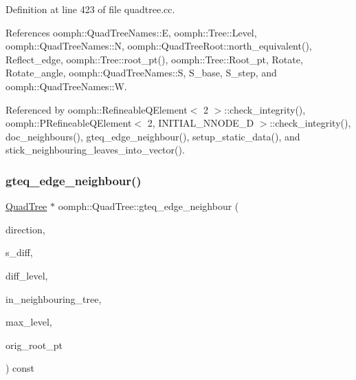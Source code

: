 Definition at line 423 of file quadtree.\+cc.



References oomph\+::\+Quad\+Tree\+Names\+::E, oomph\+::\+Tree\+::\+Level, oomph\+::\+Quad\+Tree\+Names\+::N, oomph\+::\+Quad\+Tree\+Root\+::north\+\_\+equivalent(), Reflect\+\_\+edge, oomph\+::\+Tree\+::root\+\_\+pt(), oomph\+::\+Tree\+::\+Root\+\_\+pt, Rotate, Rotate\+\_\+angle, oomph\+::\+Quad\+Tree\+Names\+::S, S\+\_\+base, S\+\_\+step, and oomph\+::\+Quad\+Tree\+Names\+::W.



Referenced by oomph\+::\+Refineable\+Q\+Element$<$ 2 $>$\+::check\+\_\+integrity(), oomph\+::\+P\+Refineable\+Q\+Element$<$ 2, I\+N\+I\+T\+I\+A\+L\+\_\+\+N\+N\+O\+D\+E\+\_\+D $>$\+::check\+\_\+integrity(), doc\+\_\+neighbours(), gteq\+\_\+edge\+\_\+neighbour(), setup\+\_\+static\+\_\+data(), and stick\+\_\+neighbouring\+\_\+leaves\+\_\+into\+\_\+vector().

\mbox{\label{classoomph_1_1QuadTree_af2a28294f1e5600481aec008a5bc2327}} 
\subsubsection{\texorpdfstring{gteq\+\_\+edge\+\_\+neighbour()}{gteq\_edge\_neighbour()}\hspace{0.1cm}{\footnotesize\ttfamily [2/2]}}
{\footnotesize\ttfamily \hyperlink{classoomph_1_1QuadTree}{Quad\+Tree} $\ast$ oomph\+::\+Quad\+Tree\+::gteq\+\_\+edge\+\_\+neighbour (\begin{DoxyParamCaption}\item[{const int \&}]{direction,  }\item[{double \&}]{s\+\_\+diff,  }\item[{int \&}]{diff\+\_\+level,  }\item[{bool \&}]{in\+\_\+neighbouring\+\_\+tree,  }\item[{int}]{max\+\_\+level,  }\item[{\hyperlink{classoomph_1_1QuadTreeRoot}{Quad\+Tree\+Root} $\ast$const \&}]{orig\+\_\+root\+\_\+pt }\end{DoxyParamCaption}) const\hspace{0.3cm}{\ttfamily [private]}}



